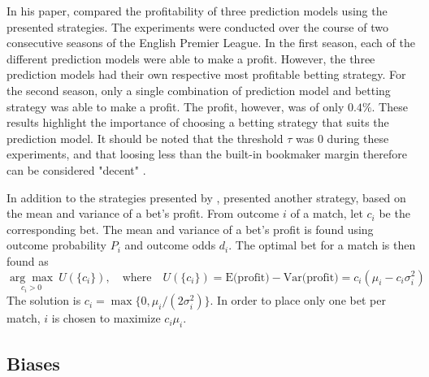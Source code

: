 In his paper, \citet{bib:langseth-2013} compared the profitability of three prediction models using the presented strategies. The experiments were conducted over the course of two consecutive seasons of the English Premier League. In the first season, each of the different prediction models were able to make a profit. However, the three prediction models had their own respective most profitable betting strategy. For the second season, only a single combination of prediction model and betting strategy was able to make a profit. The profit, however, was of only $0.4\%$. These results highlight the importance of choosing a betting strategy that suits the prediction model. It should be noted that the threshold $\tau$ was $0$ during these experiments, and that loosing less than the built-in bookmaker margin therefore can be considered "decent" \citep{bib:langseth-2013}.

In addition to the strategies presented by \citet{bib:langseth-2013}, \citet{bib:rue-salvesen-2000} presented another strategy, based on the mean and variance of a bet's profit. From outcome $i$ of a match, let $c_{i}$ be the corresponding bet. The mean and variance of a bet's profit is found using outcome probability $P_{i}$ and outcome odds $d_{i}$. The optimal bet for a match is then found as
\begin{equation*}
    \underset{c_{i} > 0}{\arg\max}\ U(\{c_{i}\}), \quad \text{where} \quad U(\{c_{i}\}) = \text{E(profit)} - \text{Var(profit)} = c_{i} (\mu_{i} - c_{i} \sigma_{i}^{2})
\end{equation*}
The solution is $c_{i} = \max \{ 0, \mu_{i}/(2 \sigma_{i}^{2}) \}$. In order to place only one bet per match, $i$ is chosen to maximize $c_{i} \mu_{i}$.



\subsection{Biases}

